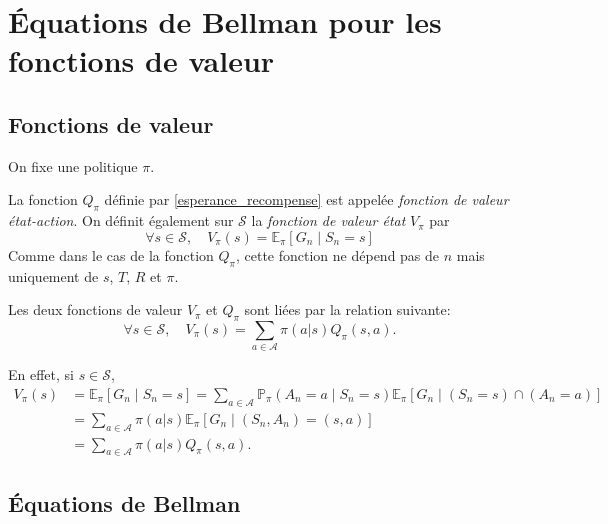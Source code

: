 \section{\'Equations de Bellman pour les fonctions de valeur}

\subsection{Fonctions de valeur}

On fixe une politique $\pi$.

\bigskip

La fonction $Q_{\pi}$ définie par \eqref{esperance_recompense} est appelée \textit{fonction de valeur état-action}. On définit également sur $\mathcal{S}$ la \textit{fonction de valeur état} $V_{\pi}$ par
$$\forall s\in\mathcal{S}, \quad V_{\pi}(s)=\mathbb{E}_{\pi}[G_n \mid S_n=s]$$
Comme dans le cas de la fonction $Q_{\pi}$, cette fonction ne dépend pas de $n$ mais uniquement de $s$, $T$, $R$ et $\pi$.

\bigskip

Les deux fonctions de valeur $V_{\pi}$ et $Q_{\pi}$ sont liées par la relation suivante:
\begin{equation}
\forall s\in\mathcal{S}, \quad V_{\pi}(s)=\sum_{a\in \mathcal{A}} \pi(a|s)Q_{\pi}(s,a).
\label{relation_V_Q}
\end{equation}

En effet, si $s\in\mathcal{S}$, 
\begin{align*}
	V_{\pi}(s)&=\mathbb{E}_{\pi}[G_n \mid S_n=s]=\sum_{a\in\mathcal{A}} \mathbb{P}_{\pi}(A_n=a \mid S_n=s) \mathbb{E}_{\pi}[G_n \mid (S_n=s)\cap (A_n=a)] \\
	&= \sum_{a\in\mathcal{A}} \pi(a|s) \mathbb{E}_{\pi}[G_n \mid (S_n,A_n)=(s,a)] \\
	&=\sum_{a\in\mathcal{A}} \pi(a|s)Q_{\pi}(s,a).
\end{align*}

\subsection{\'Equations de Bellman}

